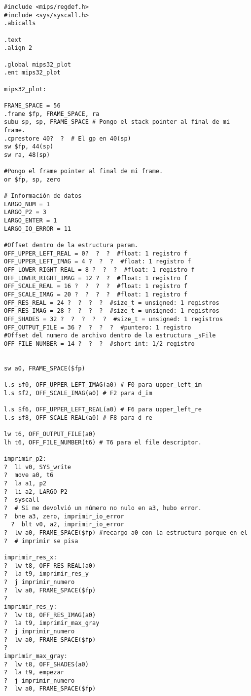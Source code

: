 \documentclass[a4paper,10pt]{article}
\begin{document}
\begin{verbatim}
#include <mips/regdef.h>
#include <sys/syscall.h>
.abicalls

.text
.align 2

.global mips32_plot
.ent mips32_plot

mips32_plot:

FRAME_SPACE = 56
.frame $fp, FRAME_SPACE, ra
subu sp, sp, FRAME_SPACE # Pongo el stack pointer al final de mi frame.
.cprestore 40?  ?  # El gp en 40(sp)
sw $fp, 44(sp)
sw ra, 48(sp)

#Pongo el frame pointer al final de mi frame.
or $fp, sp, zero

# Información de datos
LARGO_NUM = 1
LARGO_P2 = 3
LARGO_ENTER = 1
LARGO_IO_ERROR = 11

#Offset dentro de la estructura param.
OFF_UPPER_LEFT_REAL = 0?  ?  ?  #float: 1 registro f
OFF_UPPER_LEFT_IMAG = 4 ?  ?  ?  #float: 1 registro f
OFF_LOWER_RIGHT_REAL = 8 ?  ?  ?  #float: 1 registro f
OFF_LOWER_RIGHT_IMAG = 12 ?  ?  #float: 1 registro f
OFF_SCALE_REAL = 16 ?  ?  ?  ?  #float: 1 registro f
OFF_SCALE_IMAG = 20 ?  ?  ?  ?  #float: 1 registro f
OFF_RES_REAL = 24 ?  ?  ?  ?  #size_t = unsigned: 1 registros
OFF_RES_IMAG = 28 ?  ?  ?  ?  #size_t = unsigned: 1 registros
OFF_SHADES = 32 ?  ?  ?  ?  ?  #size_t = unsigned: 1 registros
OFF_OUTPUT_FILE = 36 ?  ?  ?  ?  #puntero: 1 registro
#Offset del numero de archivo dentro de la estructura _sFile
OFF_FILE_NUMBER = 14 ?  ?  ?  #short int: 1/2 registro


sw a0, FRAME_SPACE($fp)

l.s $f0, OFF_UPPER_LEFT_IMAG(a0) # F0 para upper_left_im
l.s $f2, OFF_SCALE_IMAG(a0) # F2 para d_im

l.s $f6, OFF_UPPER_LEFT_REAL(a0) # F6 para upper_left_re
l.s $f8, OFF_SCALE_REAL(a0) # F8 para d_re

lw t6, OFF_OUTPUT_FILE(a0)
lh t6, OFF_FILE_NUMBER(t6) # T6 para el file descriptor.

imprimir_p2:
?  li v0, SYS_write
?  move a0, t6
?  la a1, p2
?  li a2, LARGO_P2
?  syscall
?  # Si me devolvió un número no nulo en a3, hubo error.
?  bne a3, zero, imprimir_io_error
  ?  blt v0, a2, imprimir_io_error
?  lw a0, FRAME_SPACE($fp) #recargo a0 con la estructura porque en el 
?  # imprimir se pisa

imprimir_res_x:
?  lw t8, OFF_RES_REAL(a0)
?  la t9, imprimir_res_y
?  j imprimir_numero
?  lw a0, FRAME_SPACE($fp)
?  
imprimir_res_y:
?  lw t8, OFF_RES_IMAG(a0)
?  la t9, imprimir_max_gray
?  j imprimir_numero
?  lw a0, FRAME_SPACE($fp)
?  
imprimir_max_gray:
?  lw t8, OFF_SHADES(a0)
?  la t9, empezar
?  j imprimir_numero
?  lw a0, FRAME_SPACE($fp)


\end{verbatim}
\end{document}
